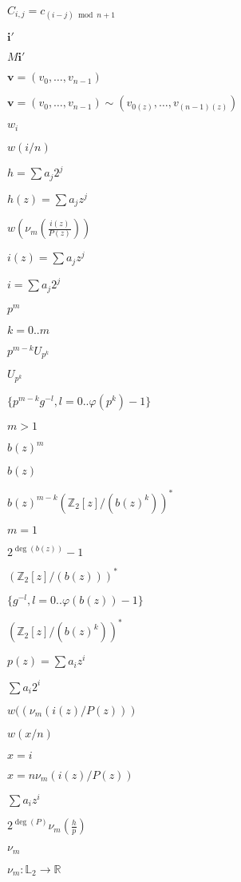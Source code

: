\documentclass{article}
\begin{document}
$C_{i,j} = c_{(i - j) \bmod n
+ 1}$
\pagebreak

$\boldsymbol i'$
\pagebreak

$M \boldsymbol i'$
\pagebreak

$\boldsymbol v = (v_0, \dots, v_{n-1})$
\pagebreak

$\boldsymbol v = (v_0, \dots, v_{n-1}) \sim (v_{0(z)}, \dots, v_{(n-1)(z)})$
\pagebreak

$w_i$
\pagebreak

$w(i/n)$
\pagebreak

$h=\sum a_j2^j$
\pagebreak

$h(z) = \sum a_jz^j$
\pagebreak

$w(\nu_m(\frac{i(z)}{P(z)}))$
\pagebreak

$i(z) = \sum a_jz^j$
\pagebreak

$i=\sum a_j2^j$
\pagebreak

$p^m$
\pagebreak

$k=0..m$
\pagebreak

$p^{m-k}U_{p^k}$
\pagebreak

$U_{p^k}$
\pagebreak

$\{p^{m-k}g^{-l}, l=0..\varphi(p^k)-1 \}$
\pagebreak

$m>1$
\pagebreak

$b(z)^m$
\pagebreak

$b(z)$
\pagebreak

$b(z)^{m-k}(\mathbb{Z}_2[z]/(b(z)^k))^*$
\pagebreak

$m=1$
\pagebreak

$2^{\deg(b(z))}-1$
\pagebreak

$(\mathbb{Z}_2[z]/(b(z)))^*$
\pagebreak

$\{g^{-l}, l=0..\varphi(b(z))-1 \}$
\pagebreak

$(\mathbb{Z}_2[z]/(b(z)^k))^*$
\pagebreak

$p(z) = \sum a_iz^i$
\pagebreak

$\sum a_i2^i$
\pagebreak

$w((\nu_m(i(z)/P(z)))$
\pagebreak

$w(x/n)$
\pagebreak

$x = i$
\pagebreak

$x = n\nu_m(i(z)/P(z))$
\pagebreak

$ \sum a_iz^i$
\pagebreak

$2^{\deg(P)}\nu_m(\frac{h} {p}) $
\pagebreak

$\nu_{m}$
\pagebreak

$\nu_{m} : \mathbb{L}_{2} \rightarrow \mathbb{R} $
\pagebreak
\end{document}
